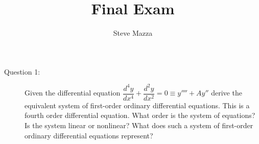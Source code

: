 \documentclass[letterpaper,10pt]{article}
\title{Final Exam}
\author{Steve Mazza}
\begin{document}
\maketitle

\begin{description}
\item[Question 1:]
Given the differential equation $\dfrac{d^4y}{dx^4}+\dfrac{d^2y}{dx^2}=0\equiv y''''+Ay''$ derive the equivalent system of first-order ordinary differential equations.  This is a fourth order differential equation.  What order is the system of equations?  Is the system linear or nonlinear?  What does such a system of first-order ordinary differential equations represent?



\end{description}
\end{document}
